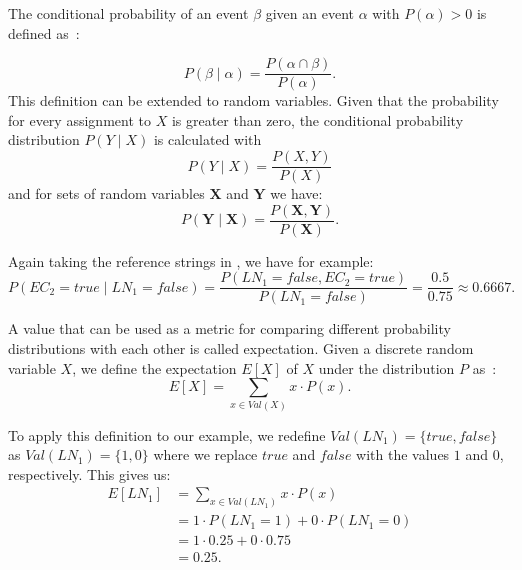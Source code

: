 \bigskip

The \gls{conditional probability} of an \gls{event} $\beta$ given an \gls{event} $\alpha$ with $P(\alpha)>0$ is defined as~\cite{koller2009probabilistic}:

\begin{equation}
\label{equ:conditional-probability-event}
P(\beta\mid\alpha) = \frac{P(\alpha\cap\beta)}{P(\alpha)}.
\end{equation}
This definition can be extended to \glspl{random variable}.
Given that the probability for every \gls{assignment} to $X$ is greater than zero, the \gls{conditional probability distribution} $P(Y\mid X)$ is calculated with
\begin{equation}
\label{equ:conditional-probability-random-variable}
P(Y\mid X) = \frac{P(X,Y)}{P(X)}
\end{equation}
and for sets of \glspl{random variable} $\mathbf{X}$ and $\mathbf{Y}$ we have:
\begin{equation}
\label{equ:conditional-probability-random-variable}
P(\mathbf{Y}\mid \mathbf{X}) = \frac{P(\mathbf{X},\mathbf{Y})}{P(\mathbf{X})}.
\end{equation}

Again taking the reference strings in , we have for example:
\begin{equation*}
  P(EC_2{=}\mathit{true}\mid LN_1{=}\mathit{false})=\frac{P(LN_1{=}\mathit{false}, EC_2{=}\mathit{true})}{P(LN_1{=}\mathit{false})}=\frac{0.5}{0.75}\approx0.6667.
\end{equation*}

\bigskip

A value that can be used as a metric for comparing different \glspl{probability distribution} with each other is called \gls{expectation}.
Given a discrete \gls{random variable} $X$, we define the expectation $E[X]$ of $X$ under the distribution $P$ as~\cite{koller2009probabilistic}:
\begin{equation}
  \label{equ:expectation-x}
  E[X]=\sum_{x\in \mathit{Val}(X)} x\cdot P(x).
\end{equation}

To apply this definition to our example, we redefine $\mathit{Val}(LN_1)=\{\mathit{true},\mathit{false}\}$ as $\mathit{Val}(LN_1)=\{1,0\}$ where we replace $\mathit{true}$ and $\mathit{false}$ with the values $1$ and $0$, respectively.
This gives us:
\begin{equation*}
  \begin{split}
  \label{equ:expectation-x}
  E[LN_1]&=\sum_{x\in \mathit{Val}(LN_1)} x\cdot P(x)\\
  &=1\cdot P(LN_1{=}1)+0\cdot P(LN_1{=}0)\\
  &=1\cdot 0.25+0\cdot 0.75\\
  &=0.25.
  \end{split}
\end{equation*}

